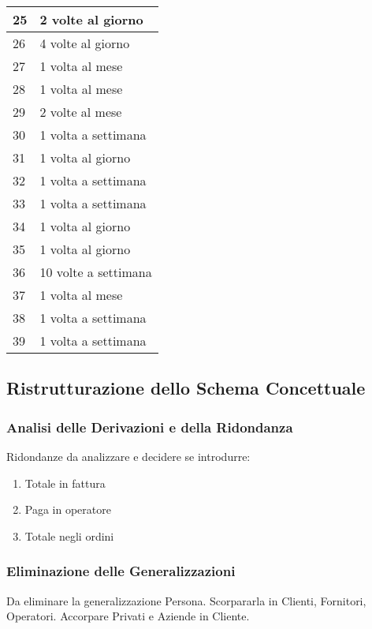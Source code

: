\begin{longtable}{| p{6cm} | p{6cm} |}
				25 & 2 volte al giorno \\ \hline
				26 & 4 volte al giorno \\ \hline
				27 & 1 volta al mese \\ \hline
				28 & 1 volta al mese \\ \hline
				29 & 2 volte al mese \\ \hline
				30 & 1 volta a settimana \\ \hline
				31 & 1 volta al giorno \\ \hline
				32 & 1 volta a settimana \\ \hline
				33 & 1 volta a settimana \\ \hline
				34 & 1 volta al giorno \\ \hline
				35 & 1 volta al giorno \\ \hline
				36 & 10 volte a settimana\\ \hline
				37 & 1 volta al mese \\ \hline
				38 & 1 volta a settimana \\ \hline
				39 & 1 volta a settimana \\ \hline
		
			\end{longtable}
		
			
	\subsection{Ristrutturazione dello Schema Concettuale}
		\subsubsection{Analisi delle Derivazioni e della Ridondanza}
			Ridondanze da analizzare e decidere se introdurre:
			\begin{enumerate}
				\item Totale in fattura
				\item Paga in operatore
				\item Totale negli ordini
			\end{enumerate}
			
		\subsubsection{Eliminazione delle Generalizzazioni}
			
			Da eliminare la generalizzazione Persona. Scorpararla in Clienti, Fornitori, Operatori. Accorpare Privati e Aziende in Cliente.
			
